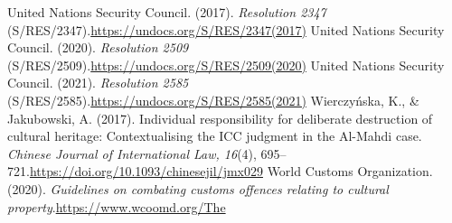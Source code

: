 \begin{referencelist}
   United Nations Security Council. (2017). \emph{Resolution 2347} (S/RES/2347).\url{https://undocs.org/S/RES/2347(2017)}
   United Nations Security Council. (2020). \emph{Resolution 2509} (S/RES/2509).\url{https://undocs.org/S/RES/2509(2020)}
   United Nations Security Council. (2021). \emph{Resolution 2585} (S/RES/2585).\url{https://undocs.org/S/RES/2585(2021)}
   Wierczyńska, K., \& Jakubowski, A. (2017). Individual responsibility for deliberate destruction of cultural heritage: Contextualising the ICC judgment in the Al-Mahdi case. \emph{Chinese Journal of International Law, 16}(4), 695–721.\url{https://doi.org/10.1093/chinesejil/jmx029}
   World Customs Organization. (2020). \emph{Guidelines on combating customs offences relating to cultural property}.\url{https://www.wcoomd.org/The}
\end{referencelist}
